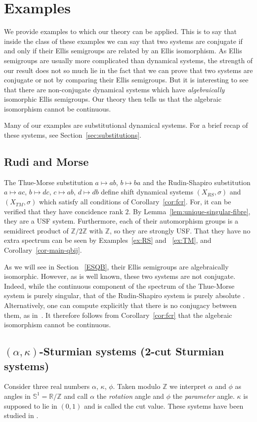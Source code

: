 \documentclass[12pt]{amsart}
\theoremstyle{definition}
\numberwithin{equation}{section}
\newcommand{\Z}{\mathbb Z}
\newcommand{\R}{\mathbb{R}}
\newcommand{\al}{\alpha}
\newcommand{\cut}{\kappa}
\begin{document}
\section{Examples}\label{sec:Examples}
We provide examples to which our theory can be applied. This is to say that inside the class of these examples we can say that two systems are conjugate if and only if their Ellis semigroups are {related by an Ellis  isomorphism}. As Ellis semigroups are usually more complicated than dynamical systems, the strength of our result does not so much lie in the fact that we can prove that two systems are conjugate or not by comparing their Ellis semigroups. But it is interesting to see that there are non-conjugate dynamical systems which have \emph{algebraically} isomorphic Ellis semigroups. Our theory then tells us that the algebraic isomorphism cannot be continuous. 

Many of our examples are substitutional dynamical systems. For a brief recap of these systems, see Section~\ref{sec:substitutions}.

\subsection{Rudi and Morse}
The Thue-Morse substitution $a\mapsto ab$, $b\mapsto ba$ and the 
Rudin-Shapiro substitution $a\mapsto ac$, $b\mapsto dc$,  $c\mapsto ab$, $d\mapsto db$ define shift dynamical systems $(X_{RS},\sigma)$ and $(X_{TM},\sigma)$ which satisfy all 
conditions of Corollary~\ref{cor:fcr}. For, it can be verified that they have concidence rank $2$. By Lemma~\ref{lem:unique-singular-fibre}, they are a USF system.  Furthermore, each of their automorphism groups is a semidirect product of $\Z/2\Z$ with  $\Z$, so they are strongly USF. That they have no extra spectrum can be seen by Examples~\ref{ex:RS} and ~\ref{ex:TM},  and Corollary~\ref{cor-main-qbij}.

 As we will see in Section ~\ref{ESQB}, their Ellis semigroups are algebraically isomorphic. However, as is well known, these two systems are not conjugate. Indeed, while the continuous component of the spectrum of the Thue-Morse system is purely singular, that of the Rudin-Shapiro system is purely absolute \cite{Baake-Grimm}. Alternatively, one can compute explicitly that there is no conjugacy between them, as in~\cite{CQY}. It therefore follows from Corollary~\ref{cor:fcr} that the 
algebraic isomorphism cannot be continuous. 

\subsection{$(\al, \cut)$-Sturmian systems (2-cut Sturmian systems)}
\label{ex:Sturmian} 
Consider three real numbers $\al$, $\cut$, $\phi$. Taken modulo $\Z$ we interpret $\al$ and $\phi$ as angles in $\mathbb S^1=\R/\Z$ and call 
$\al$ the {\em rotation} angle and $\phi$ the {\em parameter} angle. $\cut$ is supposed to lie in $(0,1)$ and is called the cut value. These systems have been studied in \cite{PS}.
\end{document}

